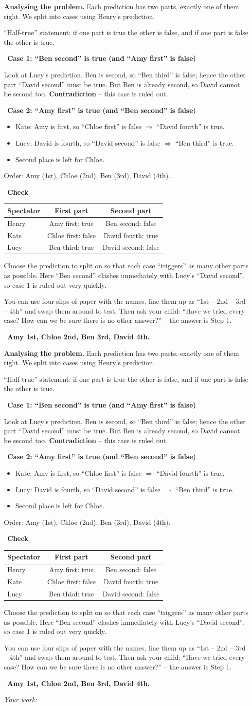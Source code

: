\documentclass[11pt]{article}
\newif\ifsol \soltrue
\providecommand{\AnsWord}{Đáp số}
\newcommand{\StuProb}[2]{\begin{probboxS}{#1}{#2}\StuProbBody\end{probboxS}}
\newcommand{\ans}[1]{\par\smallskip{\bfseries\color{tmGreen!88!black}\AnsWord:}\ {\bfseries\color{AnsRed}#1}\par}
\newcommand{\probsol}[1]{%
  \begin{lrbox}{\solmeasure}\begin{minipage}{\dimexpr\linewidth-24pt\relax}#1\end{minipage}\end{lrbox}%
  \ifsol
    \begin{solbox}#1\end{solbox}%
  \else
    \setlength{\solht}{\dimexpr\ht\solmeasure+\dp\solmeasure+0.85cm\relax}%
    \ifdim\solht<1.35cm\setlength{\solht}{1.35cm}\fi
    \ifdim\solht>\StudentMaxWork\setlength{\solht}{\StudentMaxWork}\fi
    \par\noindent\begin{minipage}{\linewidth}%
    \expandafter\StuProb\StuProbArgs
    \begin{tcolorbox}[colback=white,colframe=Line,boxrule=0.8pt,arc=5pt,
      left=8pt,right=8pt,top=4pt,bottom=4pt,height=\solht]{\footnotesize\color{Slate}\itshape\WorkWord}\end{tcolorbox}%
    \end{minipage}\par\medskip
  \fi}
\newlength{\StudentMaxWork}\setlength{\StudentMaxWork}{4.5cm}
\newcommand{\step}[2]{\par\smallskip\noindent{\bfseries\color{tmBlue!85!black}\StepWord~#1.}\ {\bfseries #2}\par\nopagebreak}
\def\WorkWord{Your work:}
\def\AnsWord{Answer}
\def\StepWord{Step}
\begin{document}
\probsol{
\textbf{Analysing the problem.} Each prediction has two parts, exactly one of them right. We split into cases using Henry's prediction.
\begin{recallbox}``Half-true'' statement: if one part is true the other is false, and if one part is false the other is true.\end{recallbox}
\step{1}{Case 1: ``Ben second'' is true (and ``Amy first'' is false)}
Look at Lucy's prediction. Ben is second, so ``Ben third'' is false; hence the other part ``David second'' must be true. But Ben is already
second, so David cannot be second too. \textbf{Contradiction} -- this case is ruled out.
\step{2}{Case 2: ``Amy first'' is true (and ``Ben second'' is false)}
\begin{itemize}[leftmargin=1.4em,itemsep=1pt,topsep=1pt]
\item Kate: Amy is first, so ``Chloe first'' is false $\Rightarrow$ ``David fourth'' is true.
\item Lucy: David is fourth, so ``David second'' is false $\Rightarrow$ ``Ben third'' is true.
\item Second place is left for Chloe.
\end{itemize}
Order: Amy (1st), Chloe (2nd), Ben (3rd), David (4th).
\step{3}{Check}
\begin{center}
\begin{tabular}{|l|c|c|}
\hline
\rowcolor{tmBlue!10} Spectator & First part & Second part \\ \hline
Henry & Amy first: \textcolor{tmGreen!70!black}{true} & Ben second: \textcolor{AnsRed}{false} \\ \hline
Kate & Chloe first: \textcolor{AnsRed}{false} & David fourth: \textcolor{tmGreen!70!black}{true} \\ \hline
Lucy & Ben third: \textcolor{tmGreen!70!black}{true} & David second: \textcolor{AnsRed}{false} \\ \hline
\end{tabular}
\end{center}
\begin{tipbox}Choose the prediction to split on so that each case ``triggers'' as many other parts as possible. Here ``Ben second'' clashes
immediately with Lucy's ``David second'', so case 1 is ruled out very quickly.\end{tipbox}
\begin{parentbox}You can use four slips of paper with the names, line them up as ``1st -- 2nd -- 3rd -- 4th'' and swap them around to test.
Then ask your child: ``Have we tried every case? How can we be sure there is no other answer?'' -- the answer is Step 1.\end{parentbox}
\ans{Amy 1st, Chloe 2nd, Ben 3rd, David 4th.}
}
\end{document}
